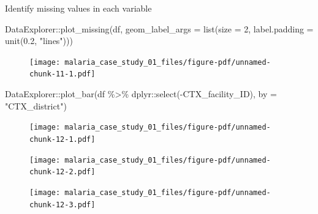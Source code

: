 \documentclass[
  letterpaper,
  DIV=11,
  numbers=noendperiod,
  oneside]{scrreprt}
\newenvironment{Shaded}{\begin{snugshade}}{\end{snugshade}}
\newcommand{\AttributeTok}[1]{\textcolor[rgb]{0.40,0.45,0.13}{#1}}
\newcommand{\DecValTok}[1]{\textcolor[rgb]{0.68,0.00,0.00}{#1}}
\newcommand{\FloatTok}[1]{\textcolor[rgb]{0.68,0.00,0.00}{#1}}
\newcommand{\FunctionTok}[1]{\textcolor[rgb]{0.28,0.35,0.67}{#1}}
\newcommand{\NormalTok}[1]{\textcolor[rgb]{0.00,0.23,0.31}{#1}}
\newcommand{\SpecialCharTok}[1]{\textcolor[rgb]{0.37,0.37,0.37}{#1}}
\newcommand{\StringTok}[1]{\textcolor[rgb]{0.13,0.47,0.30}{#1}}
\begin{document}
Identify missing values in each variable

\begin{Shaded}
\begin{Highlighting}[]
\NormalTok{DataExplorer}\SpecialCharTok{::}\FunctionTok{plot\_missing}\NormalTok{(df,}
                           \AttributeTok{geom\_label\_args =} \FunctionTok{list}\NormalTok{(}\AttributeTok{size =} \DecValTok{2}\NormalTok{, }\AttributeTok{label.padding =} \FunctionTok{unit}\NormalTok{(}\FloatTok{0.2}\NormalTok{, }\StringTok{"lines"}\NormalTok{)))}
\end{Highlighting}
\end{Shaded}

\begin{figure}[H]

{\centering \texttt{[image: malaria\_case\_study\_01\_files/figure-pdf/unnamed-chunk-11-1.pdf]}

}

\end{figure}

\begin{Shaded}
\begin{Highlighting}[]
\NormalTok{DataExplorer}\SpecialCharTok{::}\FunctionTok{plot\_bar}\NormalTok{(df }\SpecialCharTok{\%\textgreater{}\%} 
\NormalTok{                         dplyr}\SpecialCharTok{::}\FunctionTok{select}\NormalTok{(}\SpecialCharTok{{-}}\NormalTok{CTX\_facility\_ID),}
                       \AttributeTok{by =} \StringTok{"CTX\_district"}\NormalTok{)}
\end{Highlighting}
\end{Shaded}

\begin{figure}[H]

{\centering \texttt{[image: malaria\_case\_study\_01\_files/figure-pdf/unnamed-chunk-12-1.pdf]}

}

\end{figure}

\begin{figure}[H]

{\centering \texttt{[image: malaria\_case\_study\_01\_files/figure-pdf/unnamed-chunk-12-2.pdf]}

}

\end{figure}

\begin{figure}[H]

{\centering \texttt{[image: malaria\_case\_study\_01\_files/figure-pdf/unnamed-chunk-12-3.pdf]}

}

\end{figure}
\end{document}
